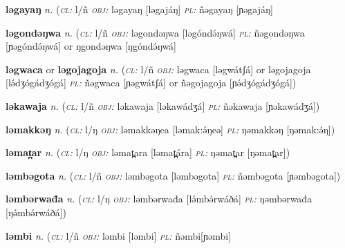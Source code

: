 \newentry
\headword\textbf{ləgayaŋ} 
\ipa{[ləgajáŋ]}
\synpos\textit{n.} 
\class(\textit{\textsc{cl:}} {l/ñ}
\object\textit{\textsc{obj:}} ləgayaŋ [ləgajáŋ]
\plural\textit{\textsc{pl:}} ñəgayaŋ [ɲəgajáŋ] 

\newentry
\headword\textbf{ləgondəŋwa} 
\synpos\textit{n.} 
\class(\textit{\textsc{cl:}} {l/ñ}
\object\textit{\textsc{obj:}} ləgondəŋwa [ləgóndə́ŋwá]
\plural\textit{\textsc{pl:}} ñəgondəŋwa [ɲəgóndə́ŋwá] or ŋgondəŋwa   [ŋgóndə́ŋwá]

\newentry
\headword\textbf{ləgwaca} or \textbf{ləgojagoja} 
\synpos\textit{n.} 
\class(\textit{\textsc{cl:}} {l/ñ}
\object\textit{\textsc{obj:}} ləgwaca [ləgwátʃá] or ləgojagoja [lə́dʒógádʒógá]
\plural\textit{\textsc{pl:}} ñəgwaca [ɲəgwátʃá] or ñəgojagoja [ɲə́dʒógádʒógá])


\newentry
\headword\textbf{ləkawaja} 
\synpos\textit{n.} 
\class(\textit{\textsc{cl:}} {l/ñ}
\object\textit{\textsc{obj:}} ləkawaja [ləkawádʒá]
\plural\textit{\textsc{pl:}} ñəkawaja [ɲəkawádʒá])

\newentry
\headword\textbf{ləmakkəŋ} 
\ipa{[ləmak:ə́ŋ]}
\synpos\textit{n.} 
\class(\textit{\textsc{cl:}} {l/ŋ}
\object\textit{\textsc{obj:}} ləmakkəŋea [ləmak:ə́ŋeə]
\plural\textit{\textsc{pl:}} ŋəmakkəŋ [ŋəmak:ə́ŋ])

	
\newentry
\headword\textbf{ləmat̪ar} 
\ipa{[ləmat̪ár]}
\synpos\textit{n.} 
\class(\textit{\textsc{cl:}} {l/ŋ}
\object\textit{\textsc{obj:}} ləmat̪ara [ləmat̪ára]
\plural\textit{\textsc{pl:}} ŋəmat̪ar [ŋəmat̪ar])

\newentry
\headword\textbf{ləmbəgota} 
\ipa{[ləmbəgota]}
\synpos\textit{n.} 
\class(\textit{\textsc{cl:}} {l/ñ}
\object\textit{\textsc{obj:}} ləmbəgota [ləmbəgota]
\plural\textit{\textsc{pl:}} ñəmbəgota [ɲəmbəgota])

\newentry
\headword\textbf{ləmbərwađa} 
\synpos\textit{n.} 
\class(\textit{\textsc{cl:}} {l/ŋ}
\object\textit{\textsc{obj:}} ləmbərwađa [lə́mbə́rwáðá]
\plural\textit{\textsc{pl:}} ŋəmbərwađa [ŋə́mbə́rwáðá])

\newentry
\headword\textbf{ləmbi} 
\ipa{[ləmbi]}
\synpos\textit{n.} 
\class(\textit{\textsc{cl:}} {l/ñ}
\object\textit{\textsc{obj:}} ləmbi [ləmbi]
\plural\textit{\textsc{pl:}} ñəmbi[ɲəmbi]


